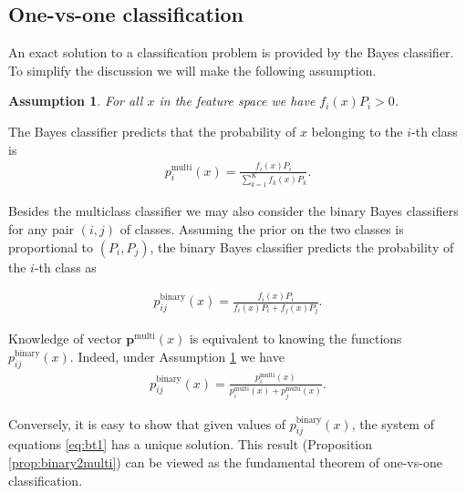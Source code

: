 \documentclass[pdflatex, sn-basic]{sn-jnl}%
\newtheorem{assumption}{Assumption}
\theoremstyle{thmstyleone}%
\theoremstyle{thmstyletwo}%
\theoremstyle{thmstylethree}%
\begin{document}
\subsection{One-vs-one classification} \label{sec:one-vs-one}

An exact solution to a classification problem is provided by the Bayes classifier. To simplify the discussion we will make the following assumption.

\begin{assumption} \label{ass:1}
For all $x$ in the feature space we have $f_i(x) P_i > 0$.
\end{assumption}


The Bayes classifier predicts that the probability of $x$ belonging to the $i$-th class is
\begin{align}
 p^\textrm{multi}_i(x) = \frac{f_i(x) P_i}{\sum_{k=1}^K f_k(x)P_k}.
\end{align}

Besides the multiclass classifier we may also consider the binary Bayes classifiers for any pair $(i,j)$ of 
classes. Assuming the prior on the two classes is proportional to $(P_i, P_j)$, the binary Bayes classifier 
predicts the probability of the $i$-th class as 

\begin{align}
	p_{ij}^\textrm{binary}(x) = \frac{f_i(x) P_i}{f_i(x)P_i + f_j(x)P_j}.
\end{align}

Knowledge of vector $\boldsymbol{p}^\textrm{multi}(x)$ is equivalent to knowing the functions $p^\textrm{binary}_{ij}(x)$. Indeed, under Assumption \ref{ass:1} we have
\begin{align}
p_{ij}^\textrm{binary}(x) = \frac{p_i^\textrm{multi}(x)}{p_i^\textrm{multi}(x) + p_j^\textrm{multi}(x)}. \label{eq:bt1}
\end{align}

Conversely, it is easy to show that  given values of $p_{ij}^\textrm{binary}(x)$, the system of equations \eqref{eq:bt1} has a unique solution. This result (Proposition \ref{prop:binary2multi}) can be viewed as the fundamental theorem of one-vs-one classification.
\end{document}
